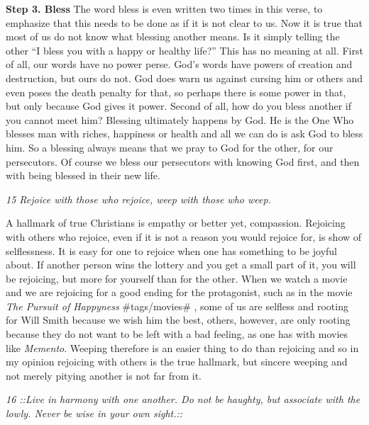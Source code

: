 \textbf{Step 3. Bless} The word bless is even written two times in this
verse, to emphasize that this needs to be done as if it is not clear to
us. Now it is true that most of us do not know what blessing another
means. Is it simply telling the other ``I bless you with a happy or
healthy life?'' This has no meaning at all. First of all, our words have
no power perse. God's words have powers of creation and destruction, but
ours do not. God does warn us against cursing him or others and even
poses the death penalty for that, so perhaps there is some power in
that, but only because God gives it power. Second of all, how do you
bless another if you cannot meet him? Blessing ultimately happens by
God. He is the One Who blesses man with riches, happiness or health and
all we can do is ask God to bless him. So a blessing always means that
we pray to God for the other, for our persecutors. Of course we bless
our persecutors with knowing God first, and then with being blessed in
their new life.

\emph{15 Rejoice with those who rejoice, weep with those who weep.}

A hallmark of true Christians is empathy or better yet, compassion.
Rejoicing with others who rejoice, even if it is not a reason you would
rejoice for, is show of selflessness. It is easy for one to rejoice when
one has something to be joyful about. If another person wins the lottery
and you get a small part of it, you will be rejoicing, but more for
yourself than for the other. When we watch a movie and we are rejoicing
for a good ending for the protagonist, such as in the movie \emph{The
Pursuit of Happyness} \#tags/movies\# , some of us are selfless and
rooting for Will Smith because we wish him the best, others, however,
are only rooting because they do not want to be left with a bad feeling,
as one has with movies like \emph{Memento}. Weeping therefore is an
easier thing to do than rejoicing and so in my opinion rejoicing with
others is the true hallmark, but sincere weeping and not merely pitying
another is not far from it.

\emph{16 ::Live in harmony with one another. Do not be haughty, but
associate with the lowly. Never be wise in your own sight.::}


